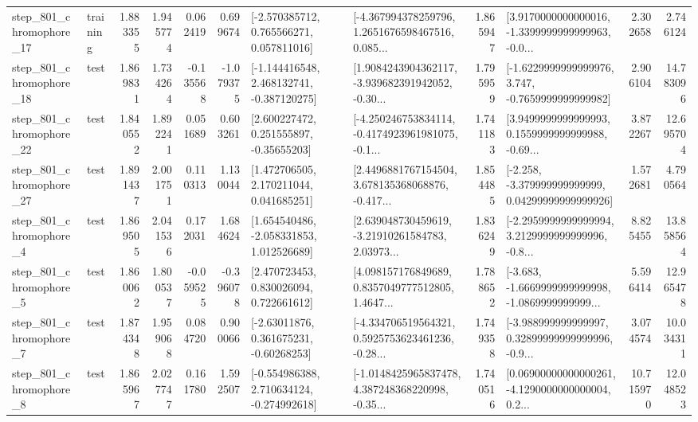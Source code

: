 \begin{tabular}{llrrrrllrlrr}
  step\_801\_chromophore\_17 &  training &      1.883355 &    1.945774 &      0.062419 &  0.699674 &    [-2.570385712, 0.765566271, 0.057811016] &  [-4.367994378259796, 1.2651676598467516, 0.085... &       1.865947 &  [3.9170000000000016, -1.3399999999999963, -0.0... &            2.302658 &          2.746124 \\
  step\_801\_chromophore\_18 &      test &      1.869831 &    1.734264 &     -0.135568 & -1.079375 &   [-1.144416548, 2.468132741, -0.387120275] &  [1.9084243904362117, -3.939682391942052, -0.30... &       1.795959 &  [-1.6229999999999976, 3.747, -0.7659999999999982] &            2.906104 &         14.783096 \\
  step\_801\_chromophore\_22 &      test &      1.840552 &    1.892241 &      0.051689 &  0.603261 &     [2.600227472, 0.251555897, -0.35655203] &  [-4.250246753834114, -0.4174923961981075, -0.1... &       1.741183 &  [3.9499999999999993, 0.1559999999999988, -0.69... &            3.872267 &         12.695704 \\
  step\_801\_chromophore\_27 &      test &      1.891437 &    2.001751 &      0.110313 &  1.130044 &     [1.472706505, 2.170211044, 0.041685251] &  [2.4496881767154504, 3.678135368068876, -0.417... &       1.854485 &  [-2.258, -3.379999999999999, 0.04299999999999926] &            1.572681 &          4.790564 \\
   step\_801\_chromophore\_4 &      test &      1.869505 &    2.041536 &      0.172031 &  1.684624 &    [1.654540486, -2.058331853, 1.012526689] &  [2.639048730459619, -3.21910261584783, 2.03973... &       1.836249 &  [-2.2959999999999994, 3.2129999999999996, -0.8... &            8.825455 &         13.858564 \\
   step\_801\_chromophore\_5 &      test &      1.860062 &    1.800537 &     -0.059525 & -0.396078 &     [2.470723453, 0.830026094, 0.722661612] &  [4.098157176849689, 0.8357049777512805, 1.4647... &       1.788652 &  [-3.683, -1.6669999999999998, -1.0869999999999... &            5.596414 &         12.965478 \\
   step\_801\_chromophore\_7 &      test &      1.874348 &    1.959068 &      0.084720 &  0.900066 &     [-2.63011876, 0.361675231, -0.60268253] &  [-4.334706519564321, 0.5925753623461236, -0.28... &       1.749358 &  [-3.988999999999997, 0.32899999999999996, -0.9... &            3.074574 &         10.034311 \\
   step\_801\_chromophore\_8 &      test &      1.865967 &    2.027747 &      0.161780 &  1.592507 &   [-0.554986388, 2.710634124, -0.274992618] &  [-1.0148425965837478, 4.387248368220998, -0.35... &       1.740516 &  [0.06900000000000261, -4.1290000000000004, 0.2... &           10.715970 &         12.048523 \\

\end{tabular}
